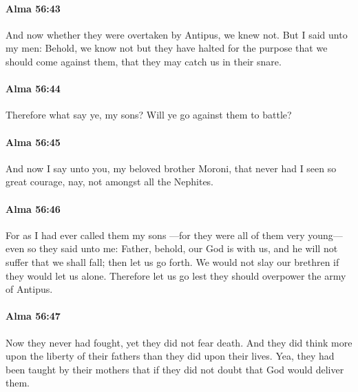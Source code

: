 		\paragraph{Alma 56:43} %
			\label{ALMA-56-43}

			And now whether they were overtaken by Antipus, we knew not.
			But I said unto my men:
			Behold, we know not but they have halted
			for the purpose that we should come against them,
			that they may catch us in their snare.

		\paragraph{Alma 56:44} %
			\label{ALMA-56-44}

			Therefore what say ye, my sons?
			Will ye go against them to battle?

		\paragraph{Alma 56:45} %
			\label{ALMA-56-45}

			And now I say unto you, my beloved brother Moroni,
			that never had I seen so great courage, nay, not amongst all the Nephites.

		\paragraph{Alma 56:46} %
			\label{ALMA-56-46}

			For as I had ever called them my sons
			---for they were all of them very young---
			even so they said unto me:
			Father, behold, our God is with us,
			and he will not suffer that we shall fall;
			then let us go forth.
			We would not slay our brethren if they would let us alone.
			Therefore let us go lest they should overpower the army of Antipus.

		\paragraph{Alma 56:47} %
			\label{ALMA-56-47}

			Now they never had fought, yet they did not fear death.
			And they did think more upon the liberty of their fathers
			than they did upon their lives.
			Yea, they had been taught by their mothers
			that if they did not doubt that God would deliver them.

